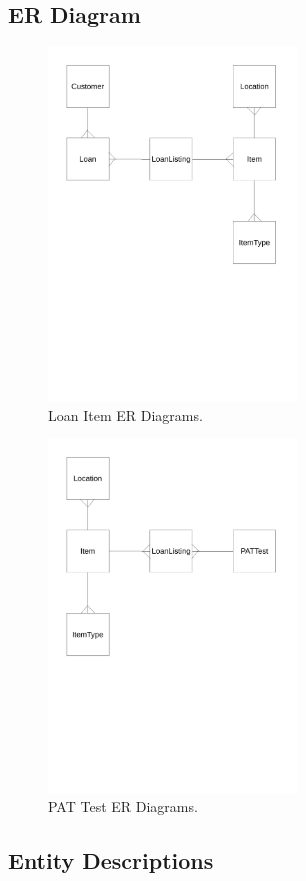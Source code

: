 \subsection{ER Diagram}

\begin{figure}[H]
    \centerline{\includegraphics[width=250px]{./Analysis/ER_Diagrams/Loan_ER_Diagrams.pdf}}
    \caption{Loan Item ER Diagrams.} \label{fig:ER Diagrams}
\end{figure}

\begin{figure}[H]
    \centerline{\includegraphics[width=250px]{./Analysis/ER_Diagrams/PAT_Test_ER_Diagrams.pdf}}
    \caption{PAT Test ER Diagrams.} \label{fig:ER Diagrams}
\end{figure}

\subsection{Entity Descriptions}

